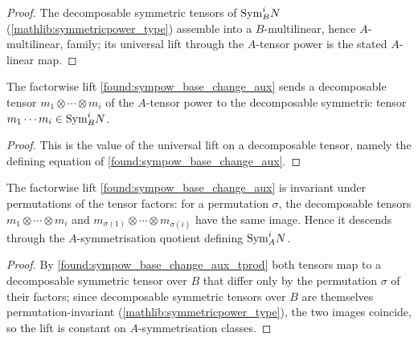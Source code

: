 \begin{proof}
  \leanok
  The decomposable symmetric tensors of \(\mathrm{Sym}^i_B N\)
  (\cref{mathlib:symmetricpower_type}) assemble into a \(B\)-multilinear, hence
  \(A\)-multilinear, family; its universal lift through the \(A\)-tensor power is
  the stated \(A\)-linear map.
\end{proof}

\begin{lemma}
  \label{found:sympow_base_change_aux_tprod}
  The factorwise lift \cref{found:sympow_base_change_aux} sends a decomposable
  tensor \(m_1\otimes\cdots\otimes m_i\) of the \(A\)-tensor power to the
  decomposable symmetric tensor \(m_1\cdots m_i\in\mathrm{Sym}^i_B N\).
\end{lemma}

\begin{proof}
  \leanok
  This is the value of the universal lift on a decomposable tensor, namely the
  defining equation of \cref{found:sympow_base_change_aux}.
\end{proof}

\begin{lemma}
  \label{found:sympow_base_change_aux_respects}
  The factorwise lift \cref{found:sympow_base_change_aux} is invariant under
  permutations of the tensor factors: for a permutation \(\sigma\), the
  decomposable tensors \(m_1\otimes\cdots\otimes m_i\) and
  \(m_{\sigma(1)}\otimes\cdots\otimes m_{\sigma(i)}\) have the same image.  Hence
  it descends through the \(A\)-symmetrisation quotient defining \(\mathrm{Sym}^i_A N\).
\end{lemma}

\begin{proof}
  \leanok
  By \cref{found:sympow_base_change_aux_tprod} both tensors map to a decomposable
  symmetric tensor over \(B\) that differ only by the permutation \(\sigma\) of
  their factors; since decomposable symmetric tensors over \(B\) are themselves
  permutation-invariant (\cref{mathlib:symmetricpower_type}), the two images
  coincide, so the lift is constant on \(A\)-symmetrisation classes.
\end{proof}


